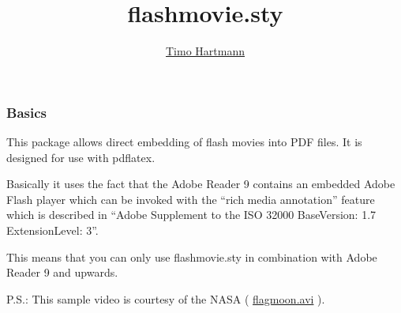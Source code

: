 \documentclass[10pt]{beamer}
\title[flashmovie.sty]{flashmovie.sty}
\author[\href{mailto:thartmann15@googlemail.com}{Timo Hartmann}]{\href{mailto:thartmann15@googlemail.com}{Timo Hartmann}}
\date[2010]{}
\def\myblank{0}
\def\mymovie{flagmoon}   %
\begin{document}


\begin{frame}

\frametitle{Basics}

\begin{minipage}[t]{6.1cm}
\vspace{0cm}
\flashmovie[width=6cm,height=5cm,engine=jw-player,auto=1,blank=\myblank]{\mymovie.mp4}
\end{minipage}
\begin{minipage}[t]{5.7cm}
\vspace{0cm}
This package allows direct embedding of flash movies into PDF files. It is
designed for use with pdflatex.
\vspace{0.5cm}

Basically it uses the fact that the Adobe Reader 9 contains an embedded Adobe Flash 
player which can be invoked with the ``rich media annotation'' feature which is described 
in ``Adobe Supplement to the ISO 32000 BaseVersion: 1.7 ExtensionLevel: 3''.
\vspace{0.5cm}

This means that you can only use flashmovie.sty in combination
with Adobe Reader 9 and upwards.

\end{minipage}

\vspace{0.5cm}

P.S.: This sample video is courtesy of the NASA ( \href{http://heasarc.gsfc.nasa.gov/Videos/historical/\mymovie.avi}{\mymovie.avi} ).

\end{frame}

\end{document}
